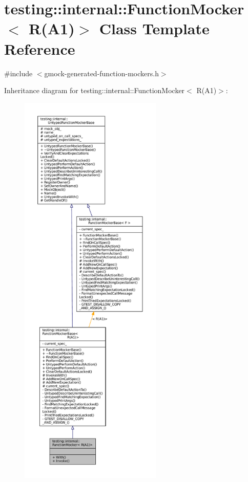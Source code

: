 \hypertarget{classtesting_1_1internal_1_1FunctionMocker_3_01R_07A1_08_4}{}\section{testing\+:\+:internal\+:\+:Function\+Mocker$<$ R(A1)$>$ Class Template Reference}
\label{classtesting_1_1internal_1_1FunctionMocker_3_01R_07A1_08_4}


{\ttfamily \#include $<$gmock-\/generated-\/function-\/mockers.\+h$>$}



Inheritance diagram for testing\+:\+:internal\+:\+:Function\+Mocker$<$ R(A1)$>$\+:
\nopagebreak
\begin{figure}[H]
\begin{center}
\leavevmode
\includegraphics[height=550pt]{classtesting_1_1internal_1_1FunctionMocker_3_01R_07A1_08_4__inherit__graph}
\end{center}
\end{figure}


